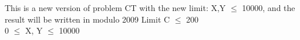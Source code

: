 This is a new version of problem CT with the new limit: X,Y $\le$ 10000, and the result will be written in modulo 2009
Limit
C  $\le$  200   
\\   0  $\le$  X, Y  $\le$  10000
